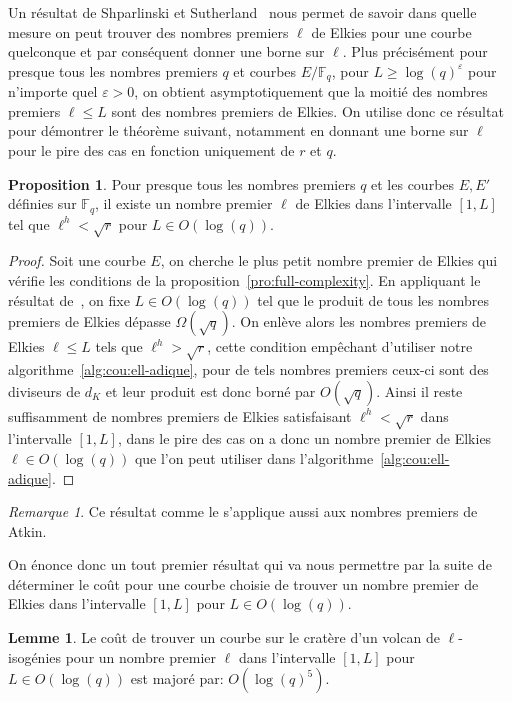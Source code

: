 \documentclass[10pt,a4paper]{book}
\theoremstyle{plain}
\theoremstyle{definition}
\newtheorem{lem}[thm]{Lemme}
\theoremstyle{definition}
\theoremstyle{definition}
\newtheorem{prop}[thm]{Proposition}
\theoremstyle{definition}
\theoremstyle{remark}
\newtheorem{rem}[thm]{Remarque}
\theoremstyle{remark}
\theoremstyle{definition}
\begin{document}
Un résultat de Shparlinski et 
Sutherland~\cite[Theorem~1]{ShparlinskiSutherland14}
nous permet de savoir dans quelle mesure on peut trouver des nombres premiers 
$\ell$ de Elkies pour une courbe quelconque et par conséquent donner une borne sur
 $\ell$. Plus précisément pour presque 
tous les nombres premiers $q$ et courbes $E/\mathbb{F}_q$, pour 
$L\geqslant\log(q)^\varepsilon$ pour n'importe quel $\varepsilon>0$,
on obtient asymptotiquement que la moitié des nombres premiers $\ell \leqslant 
L$ sont des nombres premiers de Elkies.
On utilise donc ce résultat pour démontrer le théorème suivant, notamment en donnant une 
borne sur $\ell$ pour le pire des cas en fonction uniquement de $r$ et $q$.

\begin{prop}
\label{pro:bor:ell}
Pour presque tous les nombres premiers $q$ et les courbes $E,E'$ définies sur 
$\mathbb{F}_q$, il existe un nombre premier $\ell$ de Elkies 
dans l'intervalle $[1,L]$ tel que $\ell^h < \sqrt{r}$ pour $L \in O(\log(q))$.
\end{prop}

\begin{proof}
Soit une courbe $E$, on cherche le plus petit nombre premier de Elkies qui 
  vérifie les conditions de la proposition~\ref{pro:full-complexity}.
  En appliquant le résultat de~\cite[Theorem~1]{ShparlinskiSutherland14},
  on fixe $L \in O(\log(q))$ tel que le produit de tous les nombres premiers 
  de Elkies dépasse $\Omega(\sqrt{q})$. On enlève alors les nombres premiers 
  de Elkies $\ell \leqslant L$ tels que $\ell^{h} > \sqrt{r}$, cette condition
  empêchant d'utiliser notre algorithme~\ref{alg:cou:ell-adique}, 
  pour de tels nombres premiers ceux-ci sont des diviseurs de $d_{K}$ et leur 
  produit est donc borné par $O(\sqrt{q})$. Ainsi il reste suffisamment de 
  nombres premiers de Elkies satisfaisant $\ell^{h} < \sqrt{r}$ dans 
  l'intervalle  $[1,L]$, dans le pire des cas on a donc un nombre premier de
  Elkies $\ell \in O(\log(q))$ que l'on peut utiliser dans 
  l'algorithme~\ref{alg:cou:ell-adique}.
\end{proof}

\begin{rem}
Ce résultat comme le \cite[Theorem~1]{ShparlinskiSutherland14} s'applique aussi
aux nombres premiers de Atkin.
\end{rem}

On énonce donc un tout premier résultat qui va nous permettre par la suite de
déterminer le coût pour une courbe choisie de trouver un nombre premier de 
Elkies dans l'intervalle $[1,L]$ pour $L \in O(\log(q))$.
\begin{lem}
\label{lem:cou:dec}
Le coût de trouver un courbe sur le cratère d'un volcan de $\ell$-isogénies 
pour un nombre premier $\ell$ dans l'intervalle $[1,L]$ pour $L \in O(\log(q))$
est majoré par: $O(\log(q)^5)$.
\end{lem}
\end{document}
